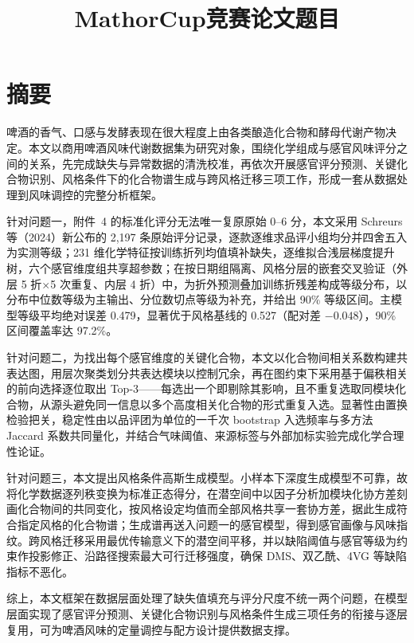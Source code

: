 \documentclass[12pt,a4paper]{article}
\begin{document}
\title{MathorCup竞赛论文题目}
\author{}
\date{}
\maketitle

\section*{摘要}

啤酒的香气、口感与发酵表现在很大程度上由各类酿造化合物和酵母代谢产物决定。本文以商用啤酒风味代谢数据集为研究对象，围绕化学组成与感官风味评分之间的关系，先完成缺失与异常数据的清洗校准，再依次开展感官评分预测、关键化合物识别、风格条件下的化合物谱生成与跨风格迁移三项工作，形成一套从数据处理到风味调控的完整分析框架。

针对问题一，附件~4 的标准化评分无法唯一复原原始 0--6 分，本文采用 Schreurs 等（2024）新公布的 2{,}197 条原始评分记录，逐款逐维求品评小组均分并四舍五入为实测等级；231 维化学特征按训练折列均值填补缺失，逐维拟合浅层梯度提升树，六个感官维度组共享超参数；在按日期组隔离、风格分层的嵌套交叉验证（外层 5 折$\times$5 次重复、内层 4 折）中，为折外预测叠加训练折残差构成等级分布，以分布中位数等级为主输出、分位数切点等级为补充，并给出 90\% 等级区间。主模型等级平均绝对误差 0.479，显著优于风格基线的 0.527（配对差 $-0.048$），90\% 区间覆盖率达 97.2\%。

针对问题二，为找出每个感官维度的关键化合物，本文以化合物间相关系数构建共表达图，用层次聚类划分共表达模块以控制冗余，再在图约束下采用基于偏秩相关的前向选择逐位取出 Top-3——每选出一个即剔除其影响，且不重复选取同模块化合物，从源头避免同一信息以多个高度相关化合物的形式重复入选。显著性由置换检验把关，稳定性由以品评团为单位的一千次 bootstrap 入选频率与多方法 Jaccard 系数共同量化，并结合气味阈值、来源标签与外部加标实验完成化学合理性论证。

针对问题三，本文提出风格条件高斯生成模型。小样本下深度生成模型不可靠，故将化学数据逐列秩变换为标准正态得分，在潜空间中以因子分析加模块化协方差刻画化合物间的共同变化，按风格设定均值而全部风格共享一套协方差，据此生成符合指定风格的化合物谱；生成谱再送入问题一的感官模型，得到感官画像与风味指纹。跨风格迁移采用最优传输意义下的潜空间平移，并以缺陷阈值与感官等级为约束作投影修正、沿路径搜索最大可行迁移强度，确保 DMS、双乙酰、4VG 等缺陷指标不恶化。

综上，本文框架在数据层面处理了缺失值填充与评分尺度不统一两个问题，在模型层面实现了感官评分预测、关键化合物识别与风格条件生成三项任务的衔接与逐层复用，可为啤酒风味的定量调控与配方设计提供数据支撑。
\end{document}
